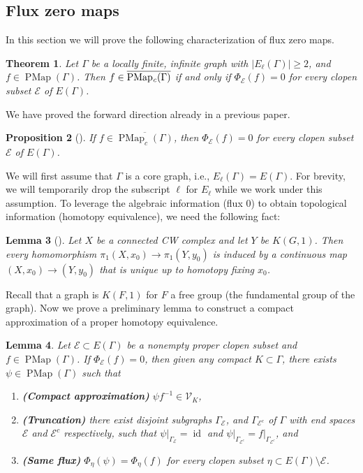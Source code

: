 \documentclass[11pt]{amsart}
\theoremstyle{plain}
\newtheorem{THM}{Theorem}[section]
\newtheorem{PROP}[THM]{Proposition}
\newtheorem{LEM}[THM]{Lemma}
\theoremstyle{definition}
\DeclareMathOperator{\id}{id}
\DeclareMathOperator{\PMap}{PMap}
\DeclareMathOperator{\PMapc}{PMap_{\it c}}
\newcommand{\cE}{\mathcal{E}}
\newcommand{\cV}{\mathcal{V}}
\def\G{{\Gamma}}
\newcommand{\<}{\langle}
\renewcommand{\>}{\rangle}
\begin{document}
\subsection{Flux zero maps} \label{ssec:semidirect}



In this section we will prove the following characterization of flux zero maps.

\begin{THM} \label{thm:fluxzeromaps}
    Let $\G$ be a locally finite, infinite graph with $|E_{\ell}(\G)| \geq 2$, and $f \in \PMap(\G)$. Then $f \in \overline{\PMapc(\G)}$ if and only if $\Phi_{\cE}(f) = 0$ for every clopen subset $\cE$ of $E(\Gamma)$.
\end{THM}

We have proved the forward direction already in a previous paper.
\begin{PROP}[{\cite[Proposition 7.13]{DHK2023}}] \label{prop:compactFluxZero}
    If $f \in \overline{\PMap_c(\G)}$, then $\Phi_\cE(f)=0$ for every clopen subset $\cE$ of $E(\G)$. 
\end{PROP}


We will first assume that $\G$ is a core graph, i.e., $E_{\ell}(\G)=E(\G)$. For brevity, we will temporarily drop the subscript $\ell$ for $E_\ell$ while we work under this assumption. To leverage the algebraic information (flux 0) to obtain topological information (homotopy equivalence), we need the following fact:

\begin{LEM}[{\cite[Proposition 1B.9]{Hatcher2002}}] \label{lem:AlgToGeom}
    Let $X$ be a connected CW complex and let $Y$ be $K(G,1)$. Then every homomorphism $\pi_1(X,x_0) \to \pi_1(Y,y_0)$ is induced by a continuous map $(X,x_0) \to (Y,y_0)$ that is unique up to homotopy fixing $x_0$.
\end{LEM}

Recall that a graph is $K(F,1)$ for $F$ a free group (the fundamental group of the graph). Now we prove a preliminary lemma to construct a compact approximation of a proper homotopy equivalence.
\begin{LEM} \label{lem:zeroflux}
    Let $\cE \subset E(\G)$ be a nonempty proper clopen subset and $f \in \PMap(\G)$. If $\Phi_{\cE}(f) = 0$, then given any compact $K \subset \G$, there exists $\psi \in \PMap(\G)$ such that
    \begin{enumerate}[label=(\roman*)]
        \item \textrm{\bf (Compact approximation)} 
            $\psi f^{-1} \in \cV_{K}$,
        \item \textrm{\bf (Truncation)} there exist disjoint subgraphs $\G_{\cE}$, and $\G_{\cE^{c}}$ of $\G$ with end spaces $\cE$ and $\cE^{c}$ respectively, such that 
            $\psi\vert_{\G_{\cE}} = \id$ and $\psi\vert_{\G_{\cE^{c}}} = f\vert_{\G_{\cE^{c}}}$, and
        \item \textrm{\bf (Same flux)}
            $\Phi_{\eta}(\psi) = \Phi_{\eta}(f)$ for every clopen subset $\eta \subset E(\G) \setminus \cE$.
    \end{enumerate}
\end{LEM}
\end{document}
